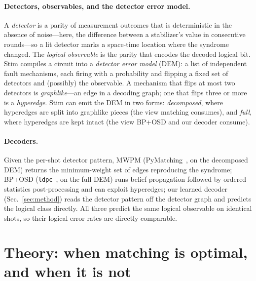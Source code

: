 \documentclass[aps,prxquantum,twocolumn,superscriptaddress,nofootinbib,longbibliography]{revtex4-2}
\begin{document}
\paragraph{Detectors, observables, and the detector error model.}
A \emph{detector} is a parity of measurement outcomes that is deterministic in
the absence of noise---here, the difference between a stabilizer's value in
consecutive rounds---so a lit detector marks a space-time location where the
syndrome changed. The \emph{logical observable} is the parity that encodes the
decoded logical bit. Stim compiles a circuit into a \emph{detector error model}
(DEM): a list of independent fault mechanisms, each firing with a probability and
flipping a fixed set of detectors and (possibly) the observable. A mechanism that
flips at most two detectors is \emph{graphlike}---an edge in a decoding graph;
one that flips three or more is a \emph{hyperedge}. Stim can emit the DEM in two
forms: \emph{decomposed}, where hyperedges are split into graphlike pieces (the
view matching consumes), and \emph{full}, where hyperedges are kept intact (the
view BP+OSD and our decoder consume).

\paragraph{Decoders.}
Given the per-shot detector pattern, MWPM (PyMatching~\cite{higgott2022pymatching},
on the decomposed DEM) returns the minimum-weight set of edges reproducing the
syndrome; BP+OSD (\texttt{ldpc}~\cite{roffe2020decoding,panteleev2021degenerate},
on the full DEM) runs belief propagation followed by ordered-statistics
post-processing and can exploit hyperedges; our learned decoder
(Sec.~\ref{sec:method}) reads the detector pattern off the detector graph and
predicts the logical class directly. All three predict the same logical
observable on identical shots, so their logical error rates are directly
comparable.

\section{Theory: when matching is optimal, and when it is not}
\label{sec:theory}
\end{document}
